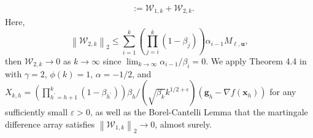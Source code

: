 \documentclass[aos]{imsart}
\numberwithin{equation}{section}
\theoremstyle{plain}
\begin{document}
\begin{appendix}
\begin{equation*}
\begin{split}
            & := \mathcal{W}_{1,k} + \mathcal{W}_{2,k}.
        \end{split}
    \end{equation*}
    Here, \begin{equation*}
        \left\|\mathcal{W}_{2,k}\right\|_2 \leq \sum_{i=1}^{k} \left( \prod_{j=i}^{k} (1-\beta_j) \right) \alpha_{i-1} M_{\bm{\ell},\bm{u}},
    \end{equation*}
    then $\mathcal{W}_{2,k} \to 0$ as $k \to \infty$ since $\lim_{k \to \infty} \alpha_{i-1}/\beta_i = 0$. We apply Theorem 4.4 in \cite{hao2014convergence} with $\gamma = 2$, $\phi(k)=1$, $\alpha=-1/2$, and $X_{k,h} = \left( \prod_{h^{\prime}=h+1}^{k} (1-\beta_{h^{\prime}}) \right) \beta_h / (\sqrt{\beta_k} k^{1/2+\epsilon}) \left( \bm{g}_h - \nabla f(\bm{x}_{h}) \right)$ for any sufficiently small $\varepsilon > 0$, as well as the Borel-Cantelli Lemma that the martingale difference array satisfies $\left\|\mathcal{W}_{1,k} \right\|_2 \to 0$, almost surely.



\end{appendix}
\end{document}

